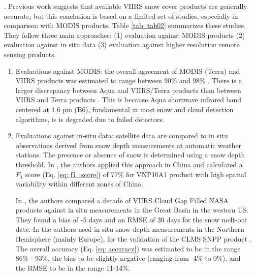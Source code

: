 \documentclass[tc, manuscript]{copernicus}
\begin{document}
\citep{lafaysse_modelisation_2023}.  Previous work suggests that available VIIRS snow cover products are generally accurate, but this conclusion is based on a limited set of studies, especially in comparison with MODIS products. Table \ref{tab: tab02} summarizes these studies. They follow three main approaches: (1) evaluation against MODIS products (2) evaluation against in situ data (3) evaluation against higher resolution remote sensing products. 

\begin{enumerate}

    \item Evaluations against MODIS: the overall agreement of MODIS (Terra) and VIIRS products was estimated to range between 90\% and 98\% \citep{riggs2023viirs, thapa_cross-comparison_2019}. There is a larger discrepancy between Aqua and VIIRS/Terra products than between VIIRS and Terra products \citep{zhang_comparative_2020}. This is because Aqua shortwave infrared band centered at 1.6 µm (B6), fundamental in most snow and cloud detection algorithms, is is degraded due to failed detectors.

    \item Evaluations against in-situ data: satellite data are compared to in situ observations derived from snow depth measurements at automatic weather stations. The presence or absence of snow is determined using a snow depth threshold. In \citep{zhang_comparative_2020}, the authors applied this approach in China and calculated a $F_1$ score (Eq. \ref{eq: f1_score}) of 77\% for VNP10A1 product with high spatial variability within different zones of China.

    In \citep{hall_comparison_2024}, the authors compared a decade of VIIRS Cloud Gap Filled NASA products against in situ measurements in the Great Basin in the western US. They found a bias of -5 days and an RMSE of 30 days for the snow melt-out date. In \citep{schwaizer2020SnowCoverExtentb} the authors used in situ snow-depth measurements in the Northern Hemisphere (mainly Europe), for the validation of the CLMS SNPP product \citep{europeanunionscopernicuslandmonitoringserviceinformationSnowCoverExtent}. 
    The overall accuracy (Eq. \ref{eq: accuracy}) was estimated to be in the range 86\% - 93\%, the bias to be slightly negative (ranging from -4\% to 0\%), and the RMSE to be in the range 11-14\%.


\end{enumerate}
\end{document}
